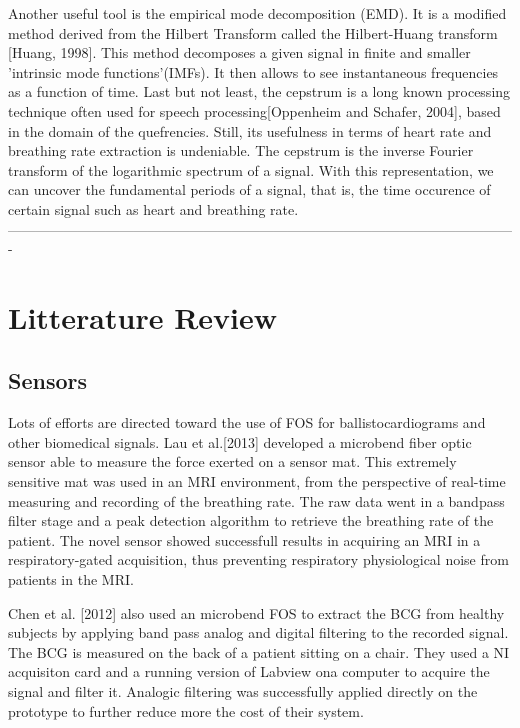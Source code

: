 \documentclass[twoside,onecolumn]{article}
\begin{document}
Another useful tool is the empirical mode decomposition (EMD). It is a modified method derived from the Hilbert Transform called the Hilbert-Huang transform [Huang, 1998]. This method decomposes a given signal in finite and smaller 'intrinsic mode functions'(IMFs). It then allows to see instantaneous frequencies as a function of time.
Last but not least, the cepstrum is a long known processing technique often used for speech processing[Oppenheim and Schafer, 2004], based in the domain of the quefrencies. Still, its usefulness in terms of heart rate and breathing rate extraction is undeniable. The cepstrum is the inverse Fourier transform of the logarithmic spectrum of a signal. With this representation, we can uncover the fundamental periods of a signal, that is, the time occurence of certain signal such as heart and breathing rate.
-------------------------------------------------------------------------------------------------------------
\section{Litterature Review}
\subsection{Sensors}
Lots of efforts are directed toward the use of FOS for ballistocardiograms and other biomedical signals. Lau et al.[2013] developed a microbend fiber optic sensor able to measure the force exerted on a sensor mat. This extremely sensitive mat was used in an MRI environment, from the perspective of real-time measuring and recording of the breathing rate. The raw data went in a bandpass filter stage and a peak detection algorithm to retrieve the breathing rate of the patient. The novel sensor showed successfull results in acquiring an MRI in a respiratory-gated acquisition, thus preventing respiratory physiological noise from patients in the MRI.

Chen et al. [2012] also used an microbend FOS to extract the BCG from healthy subjects by applying band pass analog and digital filtering to the recorded signal. The BCG is measured on the back of a patient sitting on a chair. They used a NI acquisiton card and a running version of Labview ona computer to acquire the signal and filter it. Analogic filtering was successfully applied directly on the prototype to further reduce more the cost of their system.
\end{document}
